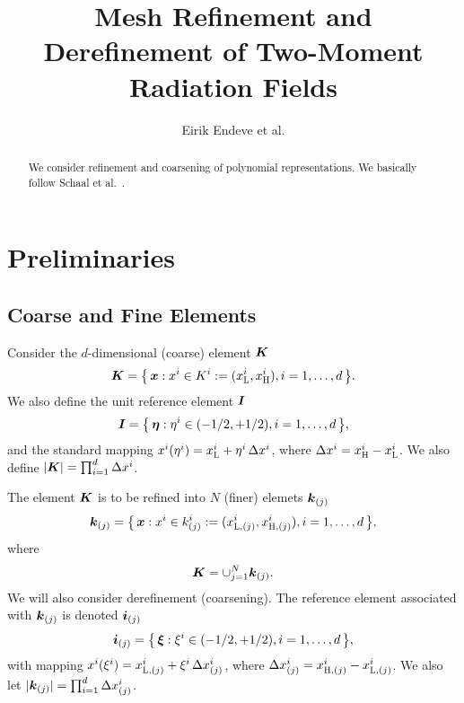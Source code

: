 \documentclass[10pt]{article}
\newcommand{\Lo}{\textsc{L}}
\newcommand{\Hi}{\textsc{H}}
\newcommand{\dx}{\Delta x}
\begin{document}
\title{Mesh Refinement and Derefinement of Two-Moment Radiation Fields}
\author{Eirik Endeve et al.}

\maketitle

\begin{abstract}
  We consider refinement and coarsening of polynomial representations.  
  We basically follow Schaal et al.~\cite{schaal_etal_2015}.  
\end{abstract}

\tableofcontents

\section{Preliminaries}

\subsection{Coarse and Fine Elements}

Consider the $d$-dimensional (coarse) element $\boldsymbol{K}$
\begin{equation}
  \vect{K} = \big\{\,\vect{x} : x^{i} \in K^{i} := (x_{\Lo}^{i},x_{\Hi}^{i}), i = 1,\ldots,d \,\big\}.  
\end{equation}
We also define the unit reference element $\boldsymbol{I}$
\begin{equation}
  \boldsymbol{I} = \big\{\,\boldsymbol{\eta} : \eta^{i} \in (-1/2,+1/2), i = 1,\ldots,d \,\big\},
\end{equation}
and the standard mapping $x^{i}(\eta^{i})=x_{\Lo}^{i}+\eta^{i}\,\dx^{i}$, where $\dx^{i}=x_{\Hi}^{i}-x_{\Lo}^{i}$.  
We also define $|\vect{K}|=\prod_{i=1}^{d}\dx^{i}$.  

The element $\boldsymbol{K}$ is to be refined into $N$ (finer) elemets $\boldsymbol{k}_{(j)}$
\begin{equation}
  \vect{k}_{(j)} = \big\{\,\vect{x} : x^{i} \in k_{(j)}^{i} := (x_{\Lo,(j)}^{i},x_{\Hi,(j)}^{i}), i = 1,\ldots,d\,\big\},
\end{equation}
where
\begin{equation}
  \boldsymbol{K} = \cup_{j=1}^{N}\boldsymbol{k}_{(j)}.  
\end{equation}
We will also consider derefinement (coarsening).  
The reference element associated with $\boldsymbol{k}_{(j)}$ is denoted $\boldsymbol{i}_{(j)}$
\begin{equation}
  \boldsymbol{i}_{(j)} = \big\{\,\boldsymbol{\xi} : \xi^{i} \in (-1/2,+1/2), i = 1,\ldots,d \,\big\},
\end{equation}
with mapping $x^{i}(\xi^{i})=x_{\Lo,(j)}^{i}+\xi^{i}\,\dx_{(j)}^{i}$, where $\dx_{(j)}^{i}=x_{\Hi,(j)}^{i}-x_{\Lo,(j)}^{i}$.  
We also let $|\vect{k}_{(j)}|=\prod_{i=1}^{d}\dx_{(j)}^{i}$.  
\end{document}
